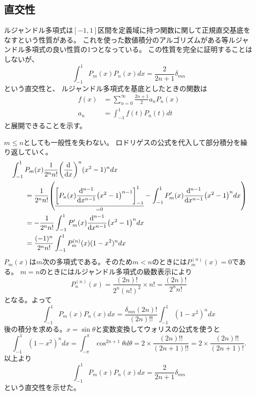 \documentclass[../master.tex]{subfiles}
\begin{document}
\subsection{直交性}
ルジャンドル多項式は\([-1, 1]\)区間を定義域に持つ関数に関して正規直交基底をなすという性質がある。
これを使った数値積分のアルゴリズムがある等ルジャンドル多項式の良い性質の1つとなっている。
この性質を完全に証明することはしないが、
\begin{equation}
	\int_{-1}^{1} P_m(x) P_n(x) dx = \frac{2}{2n+1}\delta_{mn}
\end{equation}
という直交性と、
ルジャンドル多項式を基底としたときの関数は
\begin{align}
	f(x) & = \sum_{n=0}^{\infty} \frac{2n+1}{2}a_n P_n(x) \\
	a_n  & =\int_{-1}^{1}f(t)P_n(t) dt
\end{align}
と展開できることを示す。

\(m\leq n\)としても一般性を失わない。
ロドリゲスの公式を代入して部分積分を繰り返していく。
\begin{equation}\begin{aligned}[b]
    & \int_{-1}^{1} P_m(x) \frac{1}{2^n n!} \qty(\dv{x})^n (x^2-1)^n dx \\
	 & \qquad = \frac{1}{2^n n!}
	\qty(
	\underset{=0}{\underline{
			\qty[P_n(x)\dv[n-1]{x}(x^2-1)^{n-1}]_{-1}^{1}
		}}
	- \int_{-1}^{1}P_m'(x)\dv[n-1]{x}(x^2-1)^n dx
	)                                                                           \\
	 & \qquad=-\frac{1}{2^n n!}\int_{-1}^{1}P_m'(x)\dv[n-1]{x}(x^2-1)^n dx      \\
	 & \qquad=\frac{(-1)^n}{2^n n!}\int_{-1}^{1} P_m^{(n)}(x)(1-x^2)^n dx
\end{aligned}\end{equation}
\(P_m(x)\)は\(m\)次の多項式である。そのため\(m<n\)のときには\(P_m^{(n)}(x)=0\)である。
\(m=n\)のときにはルジャンドル多項式の級数表示により
\begin{equation}
	P_n^{(n)}(x) = \frac{(2n)!}{2^n (n!)^2}\times n! = \frac{(2n)!}{2^n n!}
\end{equation}
となる。よって
\begin{equation}
	\int_{-1}^{1} P_m(x) P_n(x) dx
	= \frac{\delta_{mn}(2n)!}{(2n)!!}\int_{-1}^{1} (1-x^2)^n dx
\end{equation}
後の積分を求める。\(x=\sin\theta\)と変数変換してウォリスの公式を使うと
\begin{equation}
	\int_{-1}^{1} (1-x^2)^n dx
	= \int_{-\pi}^{\pi} \cos^{2n+1} \theta d\theta
	= 2 \times \frac{(2n)!!}{(2n+1)!!} = 2 \times \frac{(2n)!!}{(2n+1)!}.
\end{equation}
以上より
\begin{equation}
	\int_{-1}^{1} P_m(x) P_n(x) dx = \frac{2}{2n+1}\delta_{mn}
\end{equation}
という直交性を示せた。
\end{document}
